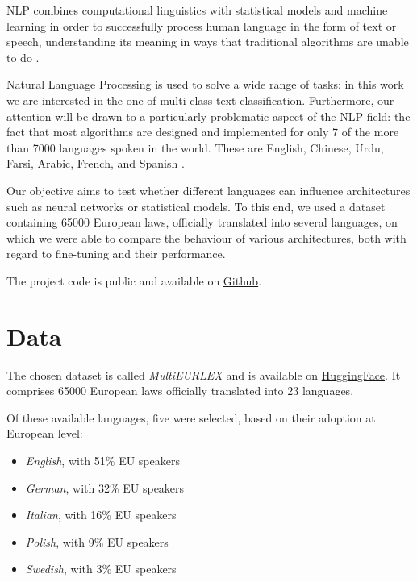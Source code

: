 \documentclass[letterpaper,11pt]{article}
\begin{document}
NLP combines computational linguistics with statistical models and machine learning in order to successfully process human language in the form of text or speech, understanding its meaning in ways that traditional algorithms are unable to do \cite{IBM_NLP}.

Natural Language Processing is used to solve a wide range of tasks: in this work we are interested in the one of multi-class text classification. Furthermore, our attention will be drawn to a particularly problematic aspect of the NLP field: the fact that most algorithms are designed and implemented for only 7 of the more than 7000 languages spoken in the world. These are English, Chinese, Urdu, Farsi, Arabic, French, and Spanish \cite{TDS_NLP}.

Our objective aims to test whether different languages can influence architectures such as neural networks or statistical models. To this end, we used a dataset containing 65000 European laws, officially translated into several languages, on which we were able to compare the behaviour of various architectures, both with regard to fine-tuning and their performance.

The project code is public and available on \href{https://github.com/DanielePassabi/Uni_NLP2022_Exam}{Github}.
 


\section{Data}

The chosen dataset is called \textit{MultiEURLEX} and is available on \href{https://huggingface.co/datasets/multi_eurlex}{HuggingFace}. It comprises 65000 European laws officially translated into 23 languages. 

Of these available languages, five were selected, based on their adoption at European level:

\begin{itemize}
  \itemsep-0.1em
  \item \textit{English}, with 51\% EU speakers
  \item \textit{German}, with 32\% EU speakers
  \item \textit{Italian}, with 16\% EU speakers
  \item \textit{Polish}, with 9\% EU speakers
  \item \textit{Swedish}, with 3\% EU speakers
\end{itemize}
\end{document}
